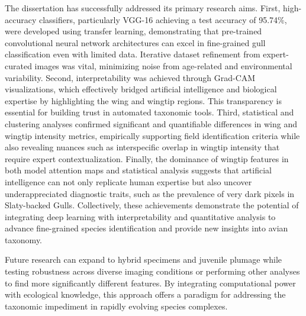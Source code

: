 \documentclass[a4paper,12pt]{report}
\begin{document}
The dissertation has successfully addressed its primary research aims. First, high-accuracy classifiers, particularly VGG-16 achieving a test accuracy of 95.74\%, were developed using transfer learning, demonstrating that pre-trained convolutional neural network architectures can excel in fine-grained gull classification even with limited data. Iterative dataset refinement from expert-curated images was vital, minimizing noise from age-related and environmental variability. Second, interpretability was achieved through Grad-CAM visualizations, which effectively bridged artificial intelligence and biological expertise by highlighting the wing and wingtip regions. This transparency is essential for building trust in automated taxonomic tools. Third, statistical and clustering analyses confirmed significant and quantifiable differences in wing and wingtip intensity metrics, empirically supporting field identification criteria while also revealing nuances such as interspecific overlap in wingtip intensity that require expert contextualization. Finally, the dominance of wingtip features in both model attention maps and statistical analysis suggests that artificial intelligence can not only replicate human expertise but also uncover underappreciated diagnostic traits, such as the prevalence of very dark pixels in Slaty-backed Gulls. Collectively, these achievements demonstrate the potential of integrating deep learning with interpretability and quantitative analysis to advance fine-grained species identification and provide new insights into avian taxonomy.

Future research can expand to hybrid specimens and juvenile plumage while testing robustness across diverse imaging conditions or performing other analyses to find more significantly different features. By integrating computational power with ecological knowledge, this approach offers a paradigm for addressing the taxonomic impediment in rapidly evolving species complexes.


\end{document}
